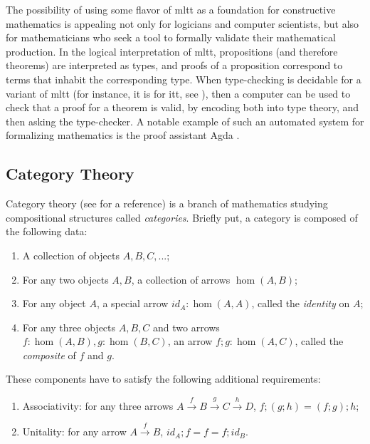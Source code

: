 \documentclass[a4paper]{article}
\begin{document}
The possibility of using some flavor of \gls{mltt} as a foundation for constructive mathematics is appealing not only for logicians and computer scientists, but also for mathematicians who seek a tool to formally validate their mathematical production. In the logical interpretation of \gls{mltt}, propositions (and therefore theorems) are interpreted as types, and proofs of a proposition correspond to terms that inhabit the corresponding type. When type-checking is decidable for a variant of \gls{mltt} (for instance, it is for \gls{itt}, see \textcite{Hofmann1995}), then a computer can be used to check that a proof for a theorem is valid, by encoding both into type theory, and then asking the type-checker. A notable example of such an automated system for formalizing mathematics is the proof assistant Agda \cite{Norell2009}.

\subsection{Category Theory}

Category theory (see \cite{Riehl2017} for a reference) is a branch of mathematics studying compositional structures called \textit{categories}. Briefly put, a category is composed of the following data:

\begin{enumerate}
	\item A collection of objects \(A, B, C, ...\);
	\item For any two objects \(A, B\), a collection of arrows \(\hom(A, B)\);
	\item For any object \(A\), a special arrow \(id_A : \hom(A, A)\), called the \textit{identity} on \(A\);
	\item For any three objects \(A, B, C\) and two arrows \(f : \hom(A, B), g : \hom(B, C)\), an arrow \(f ; g : \hom(A, C)\), called the \textit{composite} of \(f\) and \(g\).
\end{enumerate}

These components have to satisfy the following additional requirements:

\begin{enumerate}
	\item Associativity: for any three arrows \(A \xrightarrow{f} B \xrightarrow{g} C \xrightarrow{h} D\), \(f ; (g ; h) = (f ; g) ; h\);
	\item Unitality: for any arrow \(A \xrightarrow{f} B\), \(id_A ; f = f = f ; id_B\).
\end{enumerate}
\end{document}
